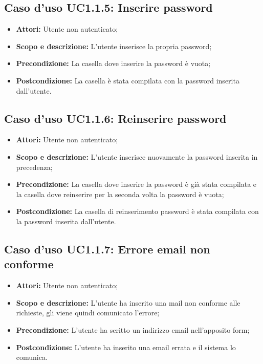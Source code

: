 \subsection{Caso d'uso UC1.1.5: Inserire password}
\begin{itemize}
	\item \textbf{Attori:} Utente non autenticato;
	\item \textbf{Scopo e descrizione:} L'utente inserisce la propria password;
	\item \textbf{Precondizione:} La casella dove inserire la password è vuota;
	\item \textbf{Postcondizione:} La casella è stata compilata con la password inserita dall'utente.
\end{itemize}

\subsection{Caso d'uso UC1.1.6: Reinserire password}
\begin{itemize}
	\item \textbf{Attori:} Utente non autenticato;
	\item \textbf{Scopo e descrizione:} L'utente inserisce nuovamente la password inserita in precedenza;
	\item \textbf{Precondizione:} La casella dove inserire la password è già stata compilata e la casella dove reinserire per la seconda volta la password è vuota;
	\item \textbf{Postcondizione:} La casella di reinserimento password è stata compilata con la password inserita dall'utente.
\end{itemize}

\subsection{Caso d'uso UC1.1.7: Errore email non conforme}
\begin{itemize}
	\item \textbf{Attori:} Utente non autenticato;
	\item \textbf{Scopo e descrizione:} L'utente ha inserito una mail non conforme alle richieste, gli viene quindi comunicato l'errore;
	\item \textbf{Precondizione:} L'utente ha scritto un indirizzo email nell'apposito form;
	\item \textbf{Postcondizione:} L'utente ha inserito una email errata e il sistema lo comunica.
\end{itemize}

